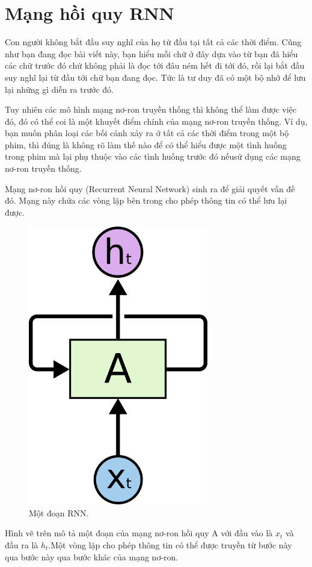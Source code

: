 \section{Mạng hồi quy RNN}
Con người không bắt đầu suy nghĩ của họ từ đầu tại tất cả các thời điểm. Cũng như bạn đang đọc bài viết này, bạn hiểu mỗi chữ ở đây dựa vào từ bạn đã hiểu các chữ trước đó chứ không phải là đọc tới đâu ném hết đi tới đó, rồi lại bắt đầu suy nghĩ lại từ đầu tới chữ bạn đang đọc. Tức là tư duy đã có một bộ nhớ để lưu lại những gì diễn ra trước đó.

Tuy nhiên các mô hình mạng nơ-ron truyền thống thì không thể làm được việc đó, đó có thể coi là một khuyết điểm chính của mạng nơ-ron truyền thống. Ví dụ, bạn muốn phân loại các bối cảnh xảy ra ở tất cả các thời điểm trong một bộ phim, thì đúng là không rõ làm thế nào để có thể hiểu được một tình huống trong phim mà lại phụ thuộc vào các tình huống trước đó nếusử dụng các mạng nơ-ron truyền thống.

Mạng nơ-ron hồi quy (Recurrent Neural Network) sinh ra để giải quyết vấn đề đó. Mạng này chứa các vòng lặp bên trong cho phép thông tin có thể lưu lại được.
\begin{figure}[h!]
	\centering
	\includegraphics[width=0.7\textwidth]{Figures/RNN-rolled.png}
	\caption[Một đoạn RNN.]{Một đoạn RNN.}
	\label{fig:RNN-rolled.png} 
\end{figure}
Hình vẽ trên mô tả một đoạn của mạng nơ-ron hồi quy A với đầu vào là \( x_{t} \) và đầu ra là \( h_{t} \).Một vòng lặp cho phép thông tin có thể được truyền từ bước này qua bước này qua bước khác của mạng nơ-ron.

